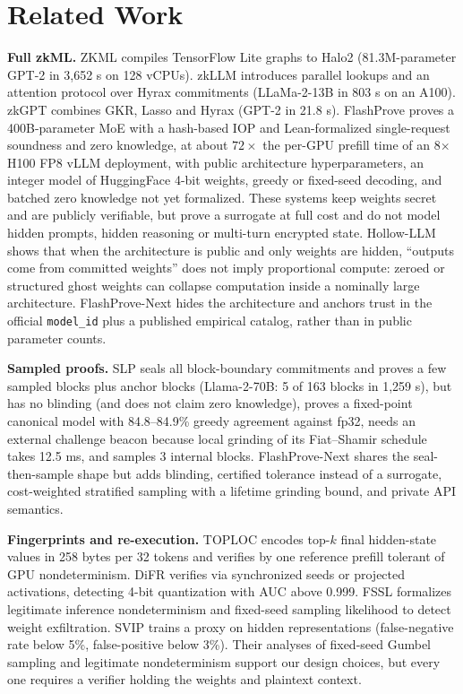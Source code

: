\documentclass[10pt]{article}
\begin{document}
\section{Related Work}
\textbf{Full zkML.} ZKML \cite{CWSK24} compiles TensorFlow Lite graphs to Halo2 (81.3M-parameter GPT-2 in 3,652 s on 128 vCPUs). zkLLM \cite{SLZ24} introduces parallel lookups and an attention protocol over Hyrax commitments (LLaMa-2-13B in 803 s on an A100). zkGPT \cite{QSL+25} combines GKR, Lasso and Hyrax (GPT-2 in 21.8 s). FlashProve \cite{RAC+26} proves a 400B-parameter MoE with a hash-based IOP and Lean-formalized single-request soundness and zero knowledge, at about $72\times$ the per-GPU prefill time of an 8$\times$H100 FP8 vLLM deployment, with public architecture hyperparameters, an integer model of HuggingFace 4-bit weights, greedy or fixed-seed decoding, and batched zero knowledge not yet formalized. These systems keep weights secret and are publicly verifiable, but prove a surrogate at full cost and do not model hidden prompts, hidden reasoning or multi-turn encrypted state. Hollow-LLM \cite{GLL26} shows that when the architecture is public and only weights are hidden, ``outputs come from committed weights'' does not imply proportional compute: zeroed or structured ghost weights can collapse computation inside a nominally large architecture. FlashProve-Next hides the architecture and anchors trust in the official \texttt{model\_\allowbreak{}id} plus a published empirical catalog, rather than in public parameter counts.

\textbf{Sampled proofs.} SLP \cite{LY26} seals all block-boundary commitments and proves a few sampled blocks plus anchor blocks (Llama-2-70B: 5 of 163 blocks in 1,259 s), but has no blinding (and does not claim zero knowledge), proves a fixed-point canonical model with 84.8--84.9\% greedy agreement against fp32, needs an external challenge beacon because local grinding of its Fiat--Shamir schedule takes 12.5 ms, and samples 3 internal blocks. FlashProve-Next shares the seal-then-sample shape but adds blinding, certified tolerance instead of a surrogate, cost-weighted stratified sampling with a lifetime grinding bound, and private API semantics.

\textbf{Fingerprints and re-execution.} TOPLOC \cite{ODP+25} encodes top-$k$ final hidden-state values in 258 bytes per 32 tokens and verifies by one reference prefill tolerant of GPU nondeterminism. DiFR \cite{KRR+25} verifies via synchronized seeds or projected activations, detecting 4-bit quantization with AUC above 0.999. FSSL \cite{RKH+25} formalizes legitimate inference nondeterminism and fixed-seed sampling likelihood to detect weight exfiltration. SVIP \cite{SLZJZ24} trains a proxy on hidden representations (false-negative rate below 5\%, false-positive below 3\%). Their analyses of fixed-seed Gumbel sampling and legitimate nondeterminism support our design choices, but every one requires a verifier holding the weights and plaintext context.
\end{document}
